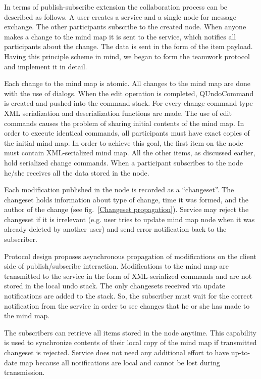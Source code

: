 In terms of publish-subscribe extension the collaboration process can be
described as follows. A user creates a service and a single node for message
exchange. The other participants subscribe to the created node. When anyone
makes a change to the mind map it is sent to the service, which notifies all
participants about the change. The data is sent in the form of the item
payload. Having this principle scheme in mind, we began to form the teamwork
protocol and implement it in detail.

Each change to the mind map is atomic. All changes to the mind map are done with
the use of dialogs. When the edit operation is completed, QUndoCommand is
created and pushed into the command stack. For every change command type XML
serialization and deserialization functions are made.  The use of edit commands
causes the problem of sharing initial contents of the mind map. In order to
execute identical commands, all participants must have exact copies of the
initial mind map. In order to achieve this goal, the first item on the node must
contain XML-serialized mind map. All the other items, as discussed earlier, hold
serialized change commands.  When a participant subscribes to the node he/she
receives all the data stored in the node.


Each modification published in the node is recorded as a ``changeset''. The
changeset holds information about type of change, time it was formed, and the
author of the change (see fig.~\ref{Changeset propagation}). Service may reject
the changeset if it is irrelevant (e.g. user tries to update mind map node when
it was already deleted by another user) and send error notification back to the
subscriber.

Protocol design proposes asynchronous propagation of modifications on the client
side of publish/subscribe interaction. Modifications to the mind map are
transmitted to the service in the form of XML-serialized commands and are not
stored in the local undo stack. The only changesets received via update
notifications are added to the stack. So, the subscriber must wait for the
correct notification from the service in order to see changes that he or she has
made to the mind map.

The subscribers can retrieve all items stored in the node anytime. This
capability is used to synchronize contents of their local copy of the mind map
if transmitted changeset is rejected. Service does not need any additional
effort to have up-to-date map because all notifications are local and cannot be
lost during transmission.

